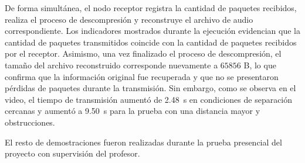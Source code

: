 De forma simultánea, el nodo receptor registra la cantidad de paquetes recibidos, realiza el proceso de descompresión y reconstruye el archivo de audio correspondiente.
Los indicadores mostrados durante la ejecución evidencian que la cantidad de paquetes transmitidos coincide con la cantidad de paquetes recibidos por el receptor.
Asimismo, una vez finalizado el proceso de descompresión, el tamaño del archivo reconstruido corresponde nuevamente a $65856$ B, lo que confirma que la información original fue recuperada y que no se presentaron pérdidas de paquetes durante la transmisión. 
Sin embargo, como se observa en el video, el tiempo de transmisión aumentó de \SI{2.48}{\second} en condiciones de separación cercanas y aumentó a \SI{9.50}{\second} para la prueba con una distancia mayor y obstrucciones.

El resto de demostraciones fueron realizadas durante la prueba presencial del proyecto con supervisión del profesor.
